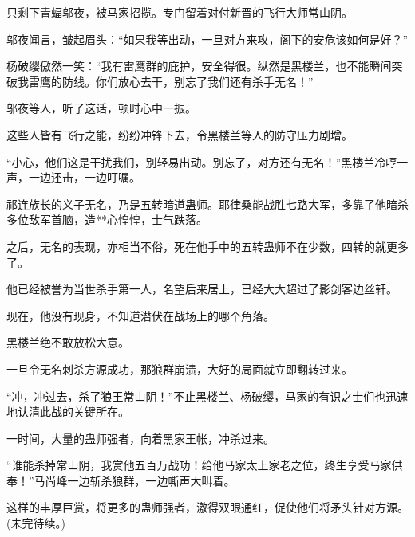 \begin{this_body}
只剩下青蝠邬夜，被马家招揽。专门留着对付新晋的飞行大师常山阴。

邬夜闻言，皱起眉头：“如果我等出动，一旦对方来攻，阁下的安危该如何是好？”

杨破缨傲然一笑：“我有雷鹰群的庇护，安全得很。纵然是黑楼兰，也不能瞬间突破我雷鹰的防线。你们放心去干，别忘了我们还有杀手无名！”

邬夜等人，听了这话，顿时心中一振。

这些人皆有飞行之能，纷纷冲锋下去，令黑楼兰等人的防守压力剧增。

“小心，他们这是干扰我们，别轻易出动。别忘了，对方还有无名！”黑楼兰冷哼一声，一边还击，一边叮嘱。

祁连族长的义子无名，乃是五转暗道蛊师。耶律桑能战胜七路大军，多靠了他暗杀多位敌军首脑，造**心惶惶，士气跌落。

之后，无名的表现，亦相当不俗，死在他手中的五转蛊师不在少数，四转的就更多了。

他已经被誉为当世杀手第一人，名望后来居上，已经大大超过了影剑客边丝轩。

现在，他没有现身，不知道潜伏在战场上的哪个角落。

黑楼兰绝不敢放松大意。

一旦令无名刺杀方源成功，那狼群崩溃，大好的局面就立即翻转过来。

“冲，冲过去，杀了狼王常山阴！”不止黑楼兰、杨破缨，马家的有识之士们也迅速地认清此战的关键所在。

一时间，大量的蛊师强者，向着黑家王帐，冲杀过来。

“谁能杀掉常山阴，我赏他五百万战功！给他马家太上家老之位，终生享受马家供奉！”马尚峰一边斩杀狼群，一边嘶声大叫着。

这样的丰厚巨赏，将更多的蛊师强者，激得双眼通红，促使他们将矛头针对方源。(未完待续。)

\end{this_body}


